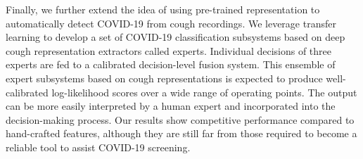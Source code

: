Finally, we further extend the idea of using pre-trained representation to automatically detect COVID-19 from cough recordings. We leverage transfer learning to develop a set of COVID-19 classification subsystems based on deep cough representation extractors called experts. Individual decisions of three experts are fed to a calibrated decision-level fusion system. This ensemble of expert subsystems based on cough representations is expected to produce well-calibrated log-likelihood scores over a wide range of operating points. The output can be more easily interpreted by a human expert and incorporated into the decision-making process. Our results show competitive performance compared to hand-crafted features, although they are still far from those required to become a reliable tool to assist COVID-19 screening.
